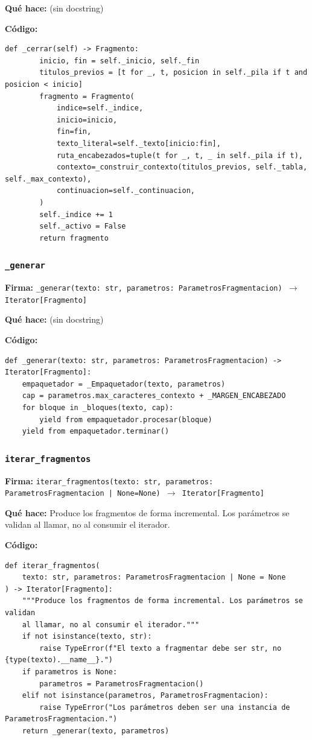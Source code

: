 \documentclass[11pt,a4paper]{article}
\begin{document}
\textbf{Qué hace:} (sin docstring)

\textbf{Código:}
\begin{lstlisting}
def _cerrar(self) -> Fragmento:
        inicio, fin = self._inicio, self._fin
        titulos_previos = [t for _, t, posicion in self._pila if t and posicion < inicio]
        fragmento = Fragmento(
            indice=self._indice,
            inicio=inicio,
            fin=fin,
            texto_literal=self._texto[inicio:fin],
            ruta_encabezados=tuple(t for _, t, _ in self._pila if t),
            contexto=_construir_contexto(titulos_previos, self._tabla, self._max_contexto),
            continuacion=self._continuacion,
        )
        self._indice += 1
        self._activo = False
        return fragmento
\end{lstlisting}

\subsubsection*{\texttt{\_generar}}
\textbf{Firma:} \texttt{\_generar(texto: str, parametros: ParametrosFragmentacion) $\rightarrow$ Iterator[Fragmento]}

\textbf{Qué hace:} (sin docstring)

\textbf{Código:}
\begin{lstlisting}
def _generar(texto: str, parametros: ParametrosFragmentacion) -> Iterator[Fragmento]:
    empaquetador = _Empaquetador(texto, parametros)
    cap = parametros.max_caracteres_contexto + _MARGEN_ENCABEZADO
    for bloque in _bloques(texto, cap):
        yield from empaquetador.procesar(bloque)
    yield from empaquetador.terminar()
\end{lstlisting}

\subsubsection*{\texttt{iterar\_fragmentos}}
\textbf{Firma:} \texttt{iterar\_fragmentos(texto: str, parametros: ParametrosFragmentacion | None=None) $\rightarrow$ Iterator[Fragmento]}

\textbf{Qué hace:} Produce los fragmentos de forma incremental. Los parámetros se validan
al llamar, no al consumir el iterador.

\textbf{Código:}
\begin{lstlisting}
def iterar_fragmentos(
    texto: str, parametros: ParametrosFragmentacion | None = None
) -> Iterator[Fragmento]:
    """Produce los fragmentos de forma incremental. Los parámetros se validan
    al llamar, no al consumir el iterador."""
    if not isinstance(texto, str):
        raise TypeError(f"El texto a fragmentar debe ser str, no {type(texto).__name__}.")
    if parametros is None:
        parametros = ParametrosFragmentacion()
    elif not isinstance(parametros, ParametrosFragmentacion):
        raise TypeError("Los parámetros deben ser una instancia de ParametrosFragmentacion.")
    return _generar(texto, parametros)
\end{lstlisting}
\end{document}
